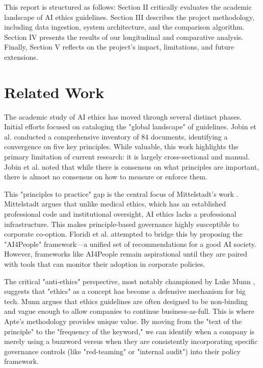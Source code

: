 \documentclass[conference]{IEEEtran}
\begin{document}
This report is structured as follows: Section II critically evaluates the academic landscape of AI ethics guidelines. Section III describes the project methodology, including data ingestion, system architecture, and the comparison algorithm. Section IV presents the results of our longitudinal and comparative analysis. Finally, Section V reflects on the project’s impact, limitations, and future extensions.

\section{Related Work}

The academic study of AI ethics has moved through several distinct phases. Initial efforts focused on cataloging the "global landscape" of guidelines. Jobin et al. \cite{jobin2019landscape} conducted a comprehensive inventory of 84 documents, identifying a convergence on five key principles. While valuable, this work highlights the primary limitation of current research: it is largely cross-sectional and manual. Jobin et al. noted that while there is consensus on what principles are important, there is almost no consensus on how to measure or enforce them.

This "principles to practice" gap is the central focus of Mittelstadt’s work \cite{mittelstadt2019ethics}. Mittelstadt argues that unlike medical ethics, which has an established professional code and institutional oversight, AI ethics lacks a professional infrastructure. This makes principle-based governance highly susceptible to corporate co-option. Floridi et al. \cite{floridi2018ai4people} attempted to bridge this by proposing the "AI4People" framework—a unified set of recommendations for a good AI society. However, frameworks like AI4People remain aspirational until they are paired with tools that can monitor their adoption in corporate policies.

The critical "anti-ethics" perspective, most notably championed by Luke Munn \cite{munn2022uselessness}, suggests that "ethics" as a concept has become a defensive mechanism for big tech. Munn argues that ethics guidelines are often designed to be non-binding and vague enough to allow companies to continue business-as-full. This is where Apte’s methodology provides unique value. By moving from the "text of the principle" to the "frequency of the keyword," we can identify when a company is merely using a buzzword versus when they are consistently incorporating specific governance controls (like "red-teaming" or "internal audit") into their policy framework.
\end{document}
